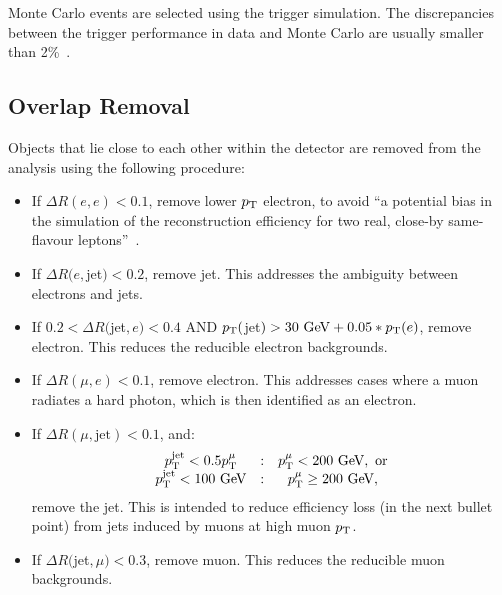 Monte Carlo events are selected using the trigger simulation. The discrepancies between the trigger performance in data and Monte Carlo are usually smaller than 2\%~\cite{Ancu:1501709}. 


\subsection{Overlap Removal}\label{sec:overlap-removal}
Objects that lie close to each other within the detector are removed from the analysis using the following procedure:
\begin{itemize}
	\item If $\Delta R(e, e) < 0.1$, remove lower $p_{\text{T}}$ electron, to avoid ``a potential bias in the simulation of the reconstruction efficiency for two real, close-by same-flavour leptons''~\cite{Adams:1700874}.
	\item If $\Delta R(e, $jet$) < 0.2$, remove jet. This addresses the ambiguity between electrons and jets.
	\item If $0.2 < \Delta R($jet$, e) < 0.4$ AND $p_{\text{T}}($jet$) > 30~\mbox{GeV} + 0.05 * p_{\text{T}}(e)$, remove electron. This reduces the reducible electron backgrounds.
	\item If $\Delta R(\mu, e) < 0.1$, remove electron. This addresses cases where a muon radiates a hard photon, which is then identified as an electron.
	\item If $\Delta R(\mu, \mbox{jet})<0.1$, and:
	\begin{equation}
		\begin{array}{ccc}
			p_{\text{T}}^{\mathrm{jet}}<0.5 p_{\text{T}}^{\mu} & : & p_{\text{T}}^{\mu} < 200~\mbox{GeV},\ \mbox{or} \\
			p_{\text{T}}^{\mathrm{jet}}<100~\mbox{GeV} & : & p_{\text{T}}^{\mu} \geq 200~\mbox{GeV},
		\end{array}
	\end{equation}
	remove the jet. This is intended to reduce efficiency loss (in the next bullet point) from jets induced by muons at high muon $p_{\text{T}}$. 
	\item If $\Delta R($jet$, \mu) < 0.3$, remove muon. This reduces the reducible muon backgrounds.
\end{itemize}



